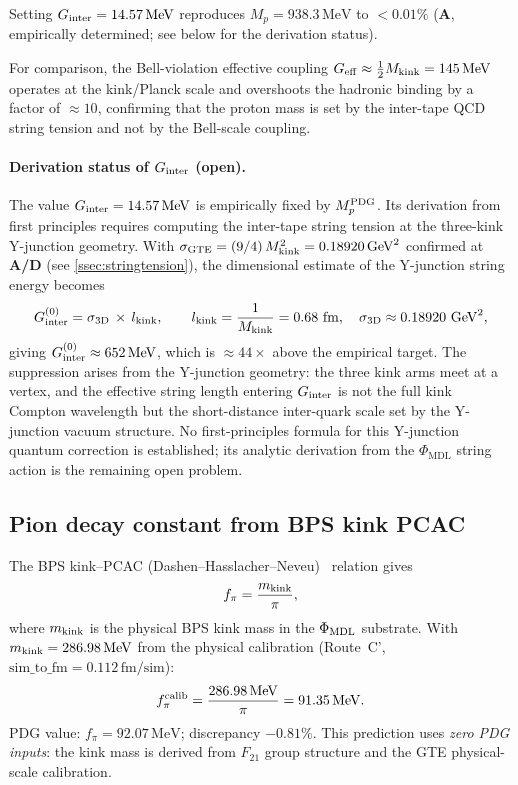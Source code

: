 \documentclass[11pt]{article}
\theoremstyle{remark}
\newcommand{\GTE}{\text{GTE}}
\newcommand{\phimdl}{\Phi_{\rm MDL}}
\newcommand{\Ftwentyone}{F_{21}}
\newcommand{\CatA}{\textbf{A}}
\newcommand{\CatAD}{\textbf{A/D}}
\begin{document}
Setting $G_{\rm inter} = 14.57\,\mathrm{MeV}$ reproduces
$M_p = 938.3\,\mathrm{MeV}$ to $< 0.01\%$ (\CatA, empirically
determined; see below for the derivation status).

For comparison, the Bell-violation effective coupling
$G_{\rm eff} \approx \tfrac{1}{2} M_{\rm kink} = 145\,\mathrm{MeV}$
operates at the kink/Planck scale and overshoots the hadronic binding by
a factor of $\approx 10$, confirming that the proton mass is set by the
inter-tape QCD string tension and not by the Bell-scale coupling.

\paragraph{Derivation status of $G_{\rm inter}$ (open).}
The value $G_{\rm inter} = 14.57\,\mathrm{MeV}$ is empirically fixed by
$M_p^{\rm PDG}$.  Its derivation from first principles requires computing
the inter-tape string tension at the three-kink Y-junction geometry.
With $\sigma_{\GTE} = (9/4)\,M_{\rm kink}^2 = 0.18920\,\mathrm{GeV}^2$
confirmed at \CatAD{} (see \cref{ssec:stringtension}), the dimensional
estimate of the Y-junction string energy becomes
\begin{equation}
  G_{\rm inter}^{\rm(0)} = \sigma_{\rm 3D}\,\times\,l_{\rm kink},
  \qquad
  l_{\rm kink} = \frac{1}{M_{\rm kink}} = 0.68\ \mathrm{fm},
  \quad
  \sigma_{\rm 3D} \approx 0.18920\ \mathrm{GeV}^2,
\end{equation}
giving $G_{\rm inter}^{\rm(0)} \approx 652\,\mathrm{MeV}$, which is
$\approx 44\times$ above the empirical target.
The suppression arises from the Y-junction geometry: the three kink arms meet at
a vertex, and the effective string length entering $G_{\rm inter}$ is not the
full kink Compton wavelength but the short-distance inter-quark scale set by
the Y-junction vacuum structure.
No first-principles formula for this Y-junction quantum correction is
established; its analytic derivation from the $\Phi_{\mathrm{MDL}}$ string
action is the remaining open problem.

\subsection{Pion decay constant from BPS kink PCAC}
\label{ssec:fpi}

The BPS kink--PCAC (Dashen--Hasslacher--Neveu)~\cite{DashenHasslacherNeveu1975} relation gives
\begin{equation}
  f_\pi = \frac{m_{\rm kink}}{\pi},
  \label{eq:fpi}
\end{equation}
where $m_{\rm kink}$ is the physical BPS kink mass in the $\phimdl$ substrate.
With $m_{\rm kink} = 286.98\,\mathrm{MeV}$ from the physical calibration
(Route~C', $\text{sim\_to\_fm} = 0.112\,\text{fm/sim}$):
\begin{equation}
  f_\pi^{\rm calib} = \frac{286.98\,\mathrm{MeV}}{\pi} = 91.35\,\mathrm{MeV}.
  \label{eq:fpivalue}
\end{equation}
PDG value: $f_\pi = 92.07\,\mathrm{MeV}$; discrepancy $-0.81\%$.
This prediction uses \emph{zero PDG inputs}: the kink mass is derived from
$\Ftwentyone$ group structure and the GTE physical-scale calibration.
\end{document}
